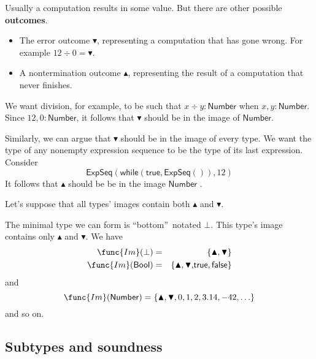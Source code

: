 \documentclass[12pt]{article}
\begin{document}
Usually a computation results in some value. But there are other possible 
\textbf{outcomes}.

\begin{itemize}
\item The error outcome $\blacktriangledown $, representing a computation
that has gone wrong. For example $12\div 0=\blacktriangledown $.

\item A nontermination outcome $\blacktriangle $, representing the result of
a computation that never finishes.
\end{itemize}

We want division, for example, to be such that $x\div y:\mathsf{Number}$
when $x,y:\mathsf{Number}$. Since $12,0:\mathsf{Number}$, it follows that $%
\blacktriangledown $ should be in the image of $\mathsf{Number}$.

Similarly, we can argue that $\blacktriangledown $ should be in the image of
every type. We want the type of any nonempty expression sequence to be the
type of its last expression. Consider%
\begin{equation*}
\mathsf{ExpSeq}\mathrm{(\mathsf{while}(\mathsf{true},\mathsf{ExpSeq}()),12)}
\end{equation*}%
It follows that $\blacktriangle $ should be be in the image $\mathsf{Number}$%
.

Let's suppose that all types' images contain both $\blacktriangle $ and $%
\blacktriangledown $.

The minimal type we can form is \textquotedblleft bottom\textquotedblright\
notated $\bot $. This type's image contains only $\blacktriangle $ and $%
\blacktriangledown $. We have 
\begin{eqnarray*}
\func{Im}(\bot ) &=&\left\{ \blacktriangle ,\blacktriangledown \right\}  \\
\func{Im}(\mathsf{Bool}) &=&\left\{ \blacktriangle ,\blacktriangledown 
\mathrm{,}\mathsf{true},\mathsf{false}\right\} 
\end{eqnarray*}%
and 
\begin{equation*}
\func{Im}(\mathsf{Number})=\left\{ \blacktriangle ,\blacktriangledown
,0,1,2,3.14,-42,\ldots \right\} 
\end{equation*}%
and so on.

\subsection{Subtypes and soundness}
\end{document}
